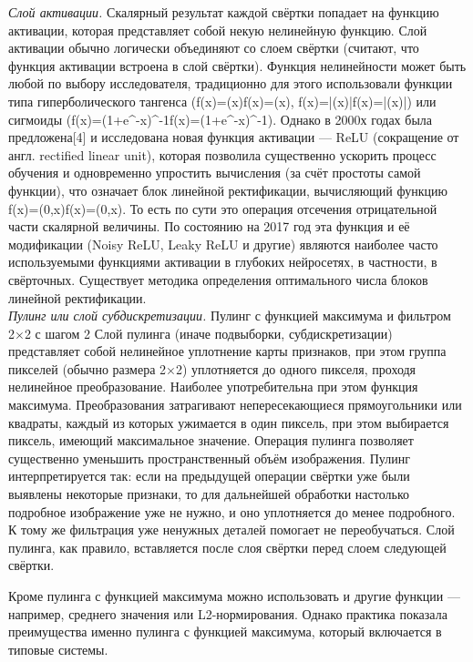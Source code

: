 \documentclass{article}
\begin{document}
\textit{Слой активации. }Скалярный результат каждой свёртки попадает на функцию активации, которая представляет собой некую нелинейную функцию. Слой активации обычно логически объединяют со слоем свёртки (считают, что функция активации встроена в слой свёртки). Функция нелинейности может быть любой по выбору исследователя, традиционно для этого использовали функции типа гиперболического тангенса ({\displaystyle f(x)=\tanh(x)}{\displaystyle f(x)=\tanh(x)}, {\displaystyle f(x)=|\tanh(x)|}{\displaystyle f(x)=|\tanh(x)|}) или сигмоиды ({\displaystyle f(x)=(1+e^{-x})^{-1}}{\displaystyle f(x)=(1+e^{-x})^{-1}}). Однако в 2000х годах была предложена[4] и исследована новая функция активации — ReLU (сокращение от англ. rectified linear unit), которая позволила существенно ускорить процесс обучения и одновременно упростить вычисления (за счёт простоты самой функции), что означает блок линейной ректификации, вычисляющий функцию {\displaystyle f(x)=\max(0,x)}{\displaystyle f(x)=\max(0,x)}. То есть по сути это операция отсечения отрицательной части скалярной величины. По состоянию на 2017 год эта функция и её модификации (Noisy ReLU, Leaky ReLU и другие) являются наиболее часто используемыми функциями активации в глубоких нейросетях, в частности, в свёрточных. Существует методика определения оптимального числа блоков линейной ректификации. \\

\textit{Пулинг или слой субдискретизации. }Пулинг с функцией максимума и фильтром 2×2 с шагом 2
Слой пулинга (иначе подвыборки, субдискретизации) представляет собой нелинейное уплотнение карты признаков, при этом группа пикселей (обычно размера 2×2) уплотняется до одного пикселя, проходя нелинейное преобразование. Наиболее употребительна при этом функция максимума. Преобразования затрагивают непересекающиеся прямоугольники или квадраты, каждый из которых ужимается в один пиксель, при этом выбирается пиксель, имеющий максимальное значение. Операция пулинга позволяет существенно уменьшить пространственный объём изображения. Пулинг интерпретируется так: если на предыдущей операции свёртки уже были выявлены некоторые признаки, то для дальнейшей обработки настолько подробное изображение уже не нужно, и оно уплотняется до менее подробного. К тому же фильтрация уже ненужных деталей помогает не переобучаться. Слой пулинга, как правило, вставляется после слоя свёртки перед слоем следующей свёртки.

Кроме пулинга с функцией максимума можно использовать и другие функции — например, среднего значения или L2-нормирования. Однако практика показала преимущества именно пулинга с функцией максимума, который включается в типовые системы.
\end{document}
